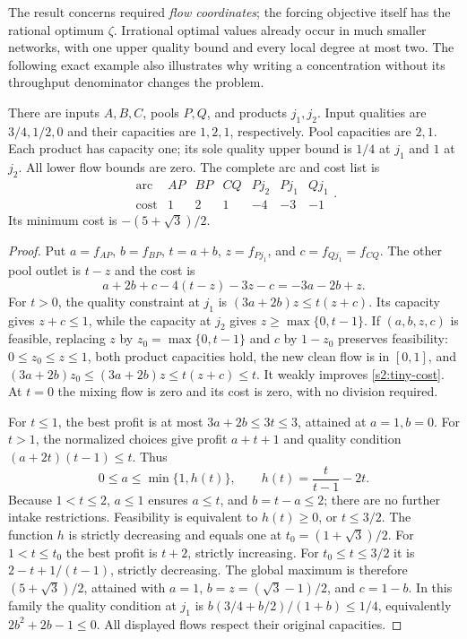 The result concerns required \emph{flow coordinates}; the forcing
objective itself has the rational optimum $\zeta$. Irrational optimal
values already occur in much smaller networks, with one upper quality
bound and every local degree at most two. The following exact example
also illustrates why writing a concentration without its throughput
denominator changes the problem.

\begin{example}\label{s2:tiny-irrational}
There are inputs $A,B,C$, pools $P,Q$, and products $j_1,j_2$.
Input qualities are $3/4,1/2,0$ and their capacities are $1,2,1$,
respectively. Pool capacities are $2,1$. Each product has capacity one;
its sole quality upper bound is $1/4$ at $j_1$ and $1$ at $j_2$.
All lower flow bounds are zero. The complete arc and cost list is
\[
 \begin{array}{c|rrrrrr}
 \text{arc}&AP&BP&CQ&Pj_2&Pj_1&Qj_1\\ \hline
 \text{cost}&1&2&1&-4&-3&-1
 \end{array}.
\]
Its minimum cost is $-(5+\sqrt3)/2$.
\end{example}
\begin{proof}
Put $a=f_{AP}$, $b=f_{BP}$, $t=a+b$, $z=f_{Pj_1}$, and
$c=f_{Qj_1}=f_{CQ}$. The other pool outlet is $t-z$ and the cost is
\begin{equation}
 a+2b+c-4(t-z)-3z-c=-3a-2b+z.\label{s2:tiny-cost}
\end{equation}
For $t>0$, the quality constraint at $j_1$ is
$(3a+2b)z\le t(z+c)$. Its capacity gives $z+c\le1$,
while the capacity at $j_2$ gives $z\ge\max\{0,t-1\}$.
If $(a,b,z,c)$ is feasible, replacing $z$ by
$z_0=\max\{0,t-1\}$ and $c$ by $1-z_0$ preserves feasibility:
$0\le z_0\le z\le1$, both product capacities hold, the new clean
flow is in $[0,1]$, and
$(3a+2b)z_0\le(3a+2b)z\le t(z+c)\le t$.
It weakly improves \eqref{s2:tiny-cost}. At $t=0$ the mixing flow is
zero and its cost is zero, with no division required.

For $t\le1$, the best profit is at most $3a+2b\le3t\le3$,
attained at $a=1,b=0$. For $t>1$, the normalized choices give profit
$a+t+1$ and quality condition
$(a+2t)(t-1)\le t$. Thus
\[
 0\le a\le\min\{1,h(t)\},\qquad
 h(t)=\frac{t}{t-1}-2t.
\]
Because $1<t\le2$, $a\le1$ ensures $a\le t$, and $b=t-a\le2$;
there are no further intake restrictions. Feasibility is equivalent
to $h(t)\ge0$, or $t\le3/2$. The function $h$ is strictly decreasing
and equals one at $t_0=(1+\sqrt3)/2$. For $1<t\le t_0$ the best
profit is $t+2$, strictly increasing. For $t_0\le t\le3/2$ it is
$2-t+1/(t-1)$, strictly decreasing. The global maximum is therefore
$(5+\sqrt3)/2$, attained with
$a=1$, $b=z=(\sqrt3-1)/2$, and $c=1-b$.
In this family the quality condition at $j_1$ is
$b(3/4+b/2)/(1+b)\le1/4$, equivalently $2b^2+2b-1\le0$.
All displayed flows respect their original capacities.
\end{proof}

